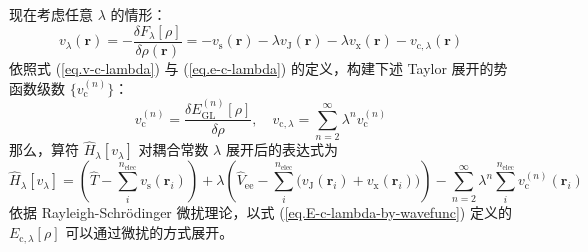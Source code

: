 现在考虑任意 $\lambda$ 的情形：
\begin{equation}
  v_{\lambda} (\bm{r}) = - \frac{\delta F_\lambda [\rho]}{\delta \rho(\bm{r})} = - v_\mathrm{s} (\bm{r}) - \lambda v_\mathrm{J}(\bm{r}) - \lambda v_\mathrm{x}(\bm{r}) - v_{\mathrm{c}, \lambda} (\bm{r})
\end{equation}
依照式 (\ref{eq.v-c-lambda}) 与 (\ref{eq.e-c-lambda}) 的定义，构建下述 Taylor 展开的势函数级数 $\{ v_\mathrm{c}^{(n)} \}$：
\begin{equation}
  v_\mathrm{c}^{(n)} = \frac{\delta E_\mathrm{GL}^{(n)} [\rho]}{\delta \rho}, \quad v_{\mathrm{c}, \lambda} = \sum_{n=2}^\infty \lambda^n v_\mathrm{c}^{(n)}
\end{equation}
那么，算符 $\hat H_\lambda [v_\lambda]$ 对耦合常数 $\lambda$ 展开后的表达式为
\begin{equation}
  \hat H_\lambda[v_\lambda] = \left( \hat T - \sum_i^{n_\mathrm{elec}} v_\mathrm{s} (\bm{r}_i) \right) + \lambda \left( \hat V_\mathrm{ee} - \sum_i^{n_\mathrm{elec}} \big( v_\mathrm{J} (\bm{r}_i) + v_\mathrm{x} (\bm{r}_i) \big) \right) - \sum_{n=2}^\infty \lambda^n \sum_{i}^{n_\mathrm{elec}} v_\mathrm{c}^{(n)} (\bm{r}_i)
\end{equation}
依据 Rayleigh-Schr\"odinger 微扰理论，以式 (\ref{eq.E-c-lambda-by-wavefunc}) 定义的 $E_{\mathrm{c}, \lambda} [\rho]$ 可以通过微扰的方式展开。

